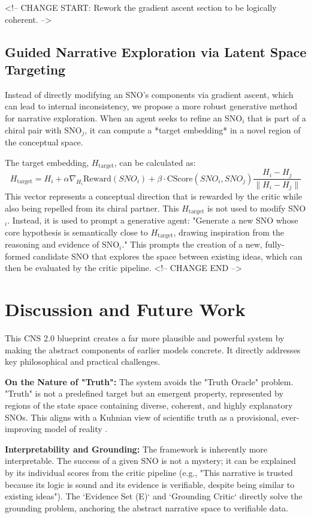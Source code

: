 \documentclass[12pt, a4paper]{article}
\begin{document}
<!-- CHANGE START: Rework the gradient ascent section to be logically coherent. -->
\subsection{Guided Narrative Exploration via Latent Space Targeting}
Instead of directly modifying an SNO's components via gradient ascent, which can lead to internal inconsistency, we propose a more robust generative method for narrative exploration. When an agent seeks to refine an SNO$_i$ that is part of a chiral pair with SNO$_j$, it can compute a *target embedding* in a novel region of the conceptual space.

The target embedding, $H_{\text{target}}$, can be calculated as:
\begin{equation} \label{eq:crga_reworked}
H_{\text{target}} = H_{i} + \alpha \nabla_{H_i} \text{Reward}(SNO_i) + \beta \cdot \text{CScore}(SNO_i, SNO_j) \frac{H_{i} - H_{j}}{\|H_{i} - H_{j}\|}
\end{equation}
This vector represents a conceptual direction that is rewarded by the critic while also being repelled from its chiral partner. This $H_{\text{target}}$ is not used to modify SNO$_i$. Instead, it is used to prompt a generative agent: "Generate a new SNO whose core hypothesis is semantically close to $H_{\text{target}}$, drawing inspiration from the reasoning and evidence of SNO$_i$." This prompts the creation of a new, fully-formed candidate SNO that explores the space between existing ideas, which can then be evaluated by the critic pipeline.
<!-- CHANGE END -->

\section{Discussion and Future Work}
This CNS 2.0 blueprint creates a far more plausible and powerful system by making the abstract components of earlier models concrete. It directly addresses key philosophical and practical challenges.

\textbf{On the Nature of "Truth":} The system avoids the "Truth Oracle" problem. "Truth" is not a predefined target but an emergent property, represented by regions of the state space containing diverse, coherent, and highly explanatory SNOs. This aligns with a Kuhnian view of scientific truth as a provisional, ever-improving model of reality \cite{Kuhn1962}.

\textbf{Interpretability and Grounding:} The framework is inherently more interpretable. The success of a given SNO is not a mystery; it can be explained by its individual scores from the critic pipeline (e.g., "This narrative is trusted because its logic is sound and its evidence is verifiable, despite being similar to existing ideas"). The `Evidence Set (E)` and `Grounding Critic` directly solve the grounding problem, anchoring the abstract narrative space to verifiable data.
\end{document}
